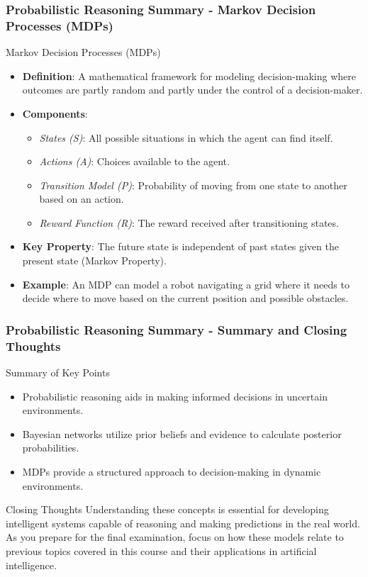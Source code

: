 \documentclass[aspectratio=169]{beamer}
\begin{document}
\begin{frame}[fragile]
  \frametitle{Probabilistic Reasoning Summary - Markov Decision Processes (MDPs)}
  \begin{block}{Markov Decision Processes (MDPs)}
    \begin{itemize}
      \item \textbf{Definition}: A mathematical framework for modeling decision-making where outcomes are partly random and partly under the control of a decision-maker.
      \item \textbf{Components}:
        \begin{itemize}
          \item \textit{States (S)}: All possible situations in which the agent can find itself.
          \item \textit{Actions (A)}: Choices available to the agent.
          \item \textit{Transition Model (P)}: Probability of moving from one state to another based on an action.
          \item \textit{Reward Function (R)}: The reward received after transitioning states.
        \end{itemize}
      \item \textbf{Key Property}: The future state is independent of past states given the present state (Markov Property).
      \item \textbf{Example}: An MDP can model a robot navigating a grid where it needs to decide where to move based on the current position and possible obstacles.
    \end{itemize}
  \end{block}
\end{frame}

\begin{frame}[fragile]
  \frametitle{Probabilistic Reasoning Summary - Summary and Closing Thoughts}
  \begin{block}{Summary of Key Points}
    \begin{itemize}
      \item Probabilistic reasoning aids in making informed decisions in uncertain environments.
      \item Bayesian networks utilize prior beliefs and evidence to calculate posterior probabilities.
      \item MDPs provide a structured approach to decision-making in dynamic environments.
    \end{itemize}
  \end{block}

  \begin{block}{Closing Thoughts}
    Understanding these concepts is essential for developing intelligent systems capable of reasoning and making predictions in the real world. As you prepare for the final examination, focus on how these models relate to previous topics covered in this course and their applications in artificial intelligence.
  \end{block}
\end{frame}
\end{document}
